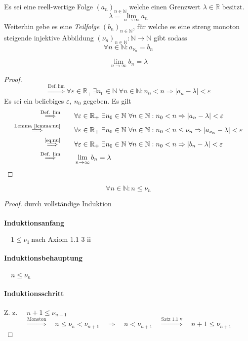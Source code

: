 \documentclass[a4paper, 12pt]{scrartcl}
\newcommand{\defimpl}[1]{\stackrel{\text{Def.}\;#1}{\Longrightarrow}}
\newcommand{\txtimpl}[1]{\stackrel{\text{#1}}{\Longrightarrow}}
\newcommand{\refimpl}[1]{\txtimpl{\eqref{#1}}}
\begin{document}
Es sei eine reell-wertige Folge $(a_n)_{n \in \mathbb{N}}$ welche einen Grenzwert $\lambda \in \mathbb{R}$ besitzt.
\[ \lambda = \lim_{n \rightarrow \infty} a_n \]
Weiterhin gebe es eine \emph{Teilfolge} $(b_n)_{n \in \mathbb{N}}$, für welche es eine streng monoton steigende injektive Abbildung $(\nu_n)_{n \in \mathbb{N}} : \mathbb{N} \rightarrow \mathbb{N}$ gibt sodass
\begin{equation}\label{eq:nu}
	\forall n \in \mathbb{N}: a_{\nu_n} = b_n
\end{equation}
\begin{theorem}
	\[ \lim_{n \rightarrow \infty} b_n = \lambda \]
\end{theorem}
\begin{proof}
\[ \defimpl{\lim} \forall \varepsilon \in \mathbb{R}_+\ \exists n_0 \in \mathbb{N}\ \forall n \in \mathbb{N} : n_0 < n \Rightarrow |a_n-\lambda| < \varepsilon \]
Es sei ein beliebiges $\varepsilon,\ n_0$ gegeben. Es gilt
\begin{align*}
	\defimpl{\lim}\qquad &\forall \varepsilon \in \mathbb{R}_+\ \exists n_0 \in \mathbb{N}\ \forall n \in \mathbb{N} : n_0 < n \Rightarrow |a_n-\lambda| < \varepsilon \\
	\txtimpl{Lemma \ref{lemma:nu}}\qquad  &\forall \varepsilon \in \mathbb{R}_+\ \exists n_0 \in \mathbb{N}\ \forall n \in \mathbb{N} : n_0 < n \leq \nu_n \Rightarrow |a_{\nu_n}-\lambda| < \varepsilon \\
	\refimpl{eq:nu} \qquad  &\forall \varepsilon \in \mathbb{R}_+\ \exists n_0 \in \mathbb{N}\ \forall n \in \mathbb{N} : n_0 < n \Rightarrow |b_n-\lambda| < \varepsilon \\
	\defimpl{\lim} \qquad & \lim_{n \rightarrow \infty} b_n = \lambda
\end{align*}
\end{proof}
\newpage
\begin{lemma}\label{lemma:nu}
	\[ \forall n \in \mathbb{N}: n \leq \nu_n \]
\end{lemma}
\begin{proof}
durch vollständige Induktion

\paragraph*{Induktionsanfang} $\quad 1 \leq \nu_1\ \text{nach Axiom 1.1 3 ii}$
\paragraph*{Induktionsbehauptung} $\quad n \leq \nu_n$
\paragraph*{Induktionsschritt} Z. z. $\quad n+1 \leq \nu_{n+1}$
\[ 	\txtimpl{Monoton}\quad  n \leq \nu_n < \nu_{n+1} \quad\Rightarrow \quad n < \nu_{n+1} \quad\txtimpl{Satz 1.1 v} \quad n+1 \leq \nu_{n+1} \]
\end{proof}
\end{document}
